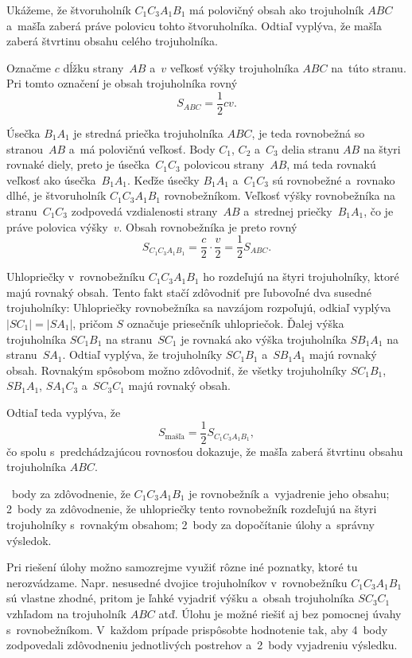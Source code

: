 {%
Ukážeme, že štvoruholník $C_1C_3A_1B_1$ má polovičný obsah ako trojuholník
$ABC$ a~mašľa zaberá práve polovicu tohto štvoruholníka.
Odtiaľ vyplýva, že mašľa zaberá štvrtinu obsahu celého trojuholníka.

Označme $c$ dĺžku strany~$AB$ a~$v$ veľkosť
výšky trojuholníka $ABC$ na~túto stranu.
Pri tomto označení je obsah trojuholníka rovný
$$
S_{ABC}=\frac12 cv.
$$

Úsečka $B_1A_1$ je stredná priečka trojuholníka $ABC$, je teda rovnobežná so
stranou~$AB$ a~má polovičnú veľkosť.
Body $C_1$, $C_2$ a~$C_3$ delia stranu $AB$ na štyri rovnaké diely, preto je
úsečka~$C_1C_3$ polovicou strany~$AB$, má teda rovnakú veľkosť ako úsečka~$B_1A_1$.
Keďže úsečky $B_1A_1$ a~$C_1C_3$ sú rovnobežné a~rovnako dlhé, je
štvoruholník $C_1C_3A_1B_1$ rovnobežníkom.
Veľkosť výšky rovnobežníka na stranu~$C_1C_3$ zodpovedá vzdialenosti strany~$AB$
a~strednej priečky~$B_1A_1$, čo je práve polovica výšky~$v$.
Obsah rovnobežníka je preto rovný
$$
S_{C_1C_3A_1B_1}=\frac{c}2\cdot\frac{v}2=\frac12 S_{ABC}.
$$

Uhlopriečky v~rovnobežníku $C_1C_3A_1B_1$ ho rozdeľujú na štyri
trojuholníky, ktoré majú rovnaký obsah.
Tento fakt stačí zdôvodniť pre ľubovoľné dva susedné trojuholníky:
Uhlopriečky rovnobežníka sa navzájom rozpoľujú, odkiaľ vyplýva $|SC_1|=|SA_1|$,
pričom $S$ označuje priesečník uhlopriečok.
Ďalej výška trojuholníka $SC_1B_1$ na stranu~$SC_1$ je rovnaká ako
výška trojuholníka $SB_1A_1$ na stranu~$SA_1$.
Odtiaľ vyplýva, že trojuholníky $SC_1B_1$ a~$SB_1A_1$ majú rovnaký obsah.
Rovnakým spôsobom možno zdôvodniť, že všetky trojuholníky $SC_1B_1$,
$SB_1A_1$, $SA_1C_3$ a~$SC_3C_1$ majú rovnaký obsah.

Odtiaľ teda vyplýva, že
$$
S_{\text{mašľa}}=\frac12S_{C_1C_3A_1B_1},
$$
čo spolu s~predchádzajúcou rovnosťou dokazuje,
že mašľa zaberá štvrtinu obsahu trojuholníka $ABC$.

~body za zdôvodnenie, že $C_1C_3A_1B_1$ je rovnobežník a~vyjadrenie jeho
obsahu;
2~body za zdôvodnenie, že uhlopriečky tento rovnobežník rozdeľujú na štyri
trojuholníky s~rovnakým obsahom;
2~body za dopočítanie úlohy a~správny výsledok.

\poznamka
Pri riešení úlohy možno samozrejme využiť rôzne iné poznatky, ktoré
tu nerozvádzame.
Napr. nesusedné dvojice trojuholníkov v~rovnobežníku $C_1C_3A_1B_1$ sú
vlastne zhodné, pritom je ľahké vyjadriť výšku a~obsah trojuholníka
$SC_3C_1$ vzhľadom na trojuholník $ABC$ atď.
Úlohu je možné riešiť aj bez pomocnej úvahy s~rovnobežníkom.
V~každom prípade prispôsobte hodnotenie tak, aby 4~body zodpovedali
zdôvodneniu jednotlivých postrehov a~2~body vyjadreniu výsledku.
\endhodnotenie
}

